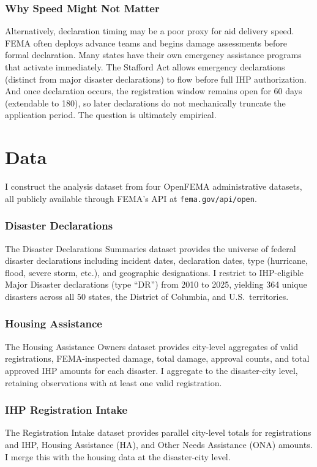 \documentclass[12pt]{article}
\begin{document}
\subsubsection*{Why Speed Might Not Matter} Alternatively, declaration timing may be a poor proxy for aid delivery speed. FEMA often deploys advance teams and begins damage assessments before formal declaration. Many states have their own emergency assistance programs that activate immediately. The Stafford Act allows emergency declarations (distinct from major disaster declarations) to flow before full IHP authorization. And once declaration occurs, the registration window remains open for 60 days (extendable to 180), so later declarations do not mechanically truncate the application period. The question is ultimately empirical.


\section{Data}

I construct the analysis dataset from four OpenFEMA administrative datasets, all publicly available through FEMA's API at \texttt{fema.gov/api/open}.

\subsubsection*{Disaster Declarations} The Disaster Declarations Summaries dataset provides the universe of federal disaster declarations including incident dates, declaration dates, type (hurricane, flood, severe storm, etc.), and geographic designations. I restrict to IHP-eligible Major Disaster declarations (type ``DR'') from 2010 to 2025, yielding 364 unique disasters across all 50 states, the District of Columbia, and U.S.\ territories.

\subsubsection*{Housing Assistance} The Housing Assistance Owners dataset provides city-level aggregates of valid registrations, FEMA-inspected damage, total damage, approval counts, and total approved IHP amounts for each disaster. I aggregate to the disaster-city level, retaining observations with at least one valid registration.

\subsubsection*{IHP Registration Intake} The Registration Intake dataset provides parallel city-level totals for registrations and IHP, Housing Assistance (HA), and Other Needs Assistance (ONA) amounts. I merge this with the housing data at the disaster-city level.
\end{document}
